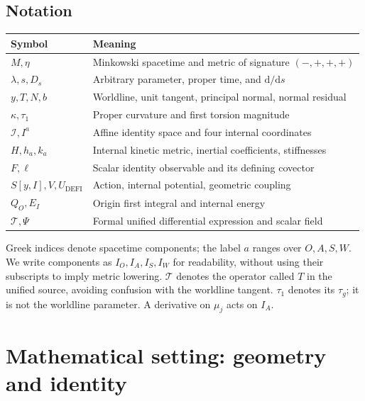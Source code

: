 \documentclass[aip,jmp,reprint,onecolumn,amsmath,amssymb]{revtex4-2}
\newcommand{\dd}{\mathrm{d}}
\newcommand{\Ds}{D_s}
\newcommand{\I}{\mathcal I}
\newcommand{\U}{U_{\mathrm{DEFI}}}
\begin{document}
\subsection{Notation}
\begin{center}
\begin{tabular}{ll}
Symbol & Meaning\\ \hline
$M,\eta$ & Minkowski spacetime and metric of signature $(-,+,+,+)$\\
$\lambda,s,\Ds$ & Arbitrary parameter, proper time, and $\dd/\dd s$\\
$y,T,N,b$ & Worldline, unit tangent, principal normal, normal residual\\
$\kappa,\tau_1$ & Proper curvature and first torsion magnitude\\
$\I,I^a$ & Affine identity space and four internal coordinates\\
$H,h_a,k_a$ & Internal kinetic metric, inertial coefficients, stiffnesses\\
$F,\ell$ & Scalar identity observable and its defining covector\\
$S[y,I],V,\U$ & Action, internal potential, geometric coupling\\
$Q_O,E_I$ & Origin first integral and internal energy\\
$\mathcal T,\Psi$ & Formal unified differential expression and scalar field\\
\end{tabular}
\end{center}
Greek indices denote spacetime components; the label $a$ ranges over $O,A,S,W$. We write components as $I_O,I_A,I_S,I_W$ for readability, without using their subscripts to imply metric lowering. $\mathcal T$ denotes the operator called $T$ in the unified source, avoiding confusion with the worldline tangent. $\tau_1$ denotes its $\tau_g$; it is not the worldline parameter. A derivative on $\mu_j$ acts on $I_A$.

\section{Mathematical setting: geometry and identity}
\end{document}
